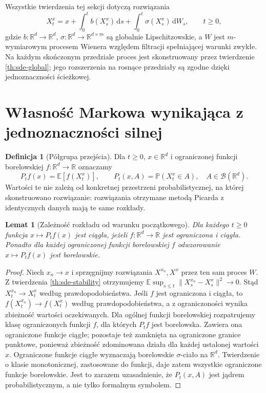 \documentclass[11pt,a4paper,oneside]{report}
\numberwithin{equation}{chapter}
\theoremstyle{plain}
\newtheorem{lemat}[twierdzenie]{Lemat}
\theoremstyle{definition}
\newtheorem{definicja}{Definicja}[chapter]
\theoremstyle{remark}
\newcommand{\R}{\mathbb{R}}
\newcommand{\Prob}{\mathbb{P}}
\newcommand{\E}{\mathbb{E}}
\newcommand{\calB}{\mathcal{B}}
\newcommand{\dd}{\mathrm{d}}
\newcommand{\norm}[1]{\lVert #1\rVert}
\begin{document}
Wszystkie twierdzenia tej sekcji dotyczą rozwiązania
\[
X_t^x=x+\int_0^t b(X_s^x)\,\dd s
+\int_0^t\sigma(X_s^x)\,\dd W_s,\qquad t\ge0,
\tag{6.1}\label{eq:timehom-sde}
\]
gdzie $b:\R^d\to\R^d$, $\sigma:\R^d\to\R^{d\times m}$
są globalnie Lipschitzowskie, a $W$ jest $m$-wymiarowym
procesem Wienera względem filtracji spełniającej warunki
zwykłe. Na każdym skończonym przedziale proces jest
skonstruowany przez twierdzenie \ref{th:sde-global};
jego rozszerzenia na rosnące przedziały są zgodne
dzięki jednoznaczności ścieżkowej.

\section{Własność Markowa wynikająca z jednoznaczności silnej}
\begin{definicja}[Półgrupa przejścia]
Dla $t\ge0$, $x\in\R^d$ i ograniczonej funkcji
borelowskiej $f:\R^d\to\R$ oznaczamy
\[
P_tf(x)=\E[f(X_t^x)],\qquad
P_t(x,A)=\Prob(X_t^x\in A),\quad A\in\calB(\R^d).
\tag{6.2}\label{eq:sde-semigroup}
\]
Wartości te nie zależą od konkretnej przestrzeni
probabilistycznej, na której skonstruowano rozwiązanie:
rozwiązania otrzymane metodą Picarda z identycznych
danych mają te same rozkłady.
\end{definicja}

\begin{lemat}[Zależność rozkładu od warunku początkowego]
\label{lem:sde-kernel}
Dla każdego $t\ge0$ funkcja $x\mapsto P_tf(x)$
jest ciągła, jeżeli $f:\R^d\to\R$ jest ograniczona
i ciągła. Ponadto dla każdej ograniczonej funkcji
borelowskiej $f$ odwzorowanie $x\mapsto P_tf(x)$
jest borelowskie.
\end{lemat}
\begin{proof}
Niech $x_n\to x$ i sprzęgnijmy rozwiązania
$X^{x_n},X^x$ przez ten sam proces $W$.
Z twierdzenia \ref{th:sde-stability} otrzymujemy
$\E\sup_{s\le t}\norm{X_s^{x_n}-X_s^x}^2\to0$.
Stąd $X_t^{x_n}\to X_t^x$ według prawdopodobieństwa.
Jeśli $f$ jest ograniczona i ciągła, to
$f(X_t^{x_n})\to f(X_t^x)$ według prawdopodobieństwa,
a z ograniczoności wynika zbieżność wartości oczekiwanych.
Dla ogólnej funkcji borelowskiej rozpatrujemy klasę
ograniczonych funkcji $f$, dla których $P_tf$ jest
borelowska. Zawiera ona ograniczone funkcje ciągłe;
pozostaje też zamknięta na ograniczone granice punktowe,
ponieważ zbieżność zdominowana działa dla każdej
ustalonej wartości $x$. Ograniczone funkcje ciągłe
wyznaczają borelowskie $\sigma$-ciało na $\R^d$.
Twierdzenie o klasie monotonicznej, zastosowane do
funkcji, daje zatem wszystkie ograniczone funkcje
borelowskie. Jest to zarazem uzasadnienie, że
$P_t(x,A)$ jest jądrem probabilistycznym, a nie
tylko formalnym symbolem.
\end{proof}
\end{document}
